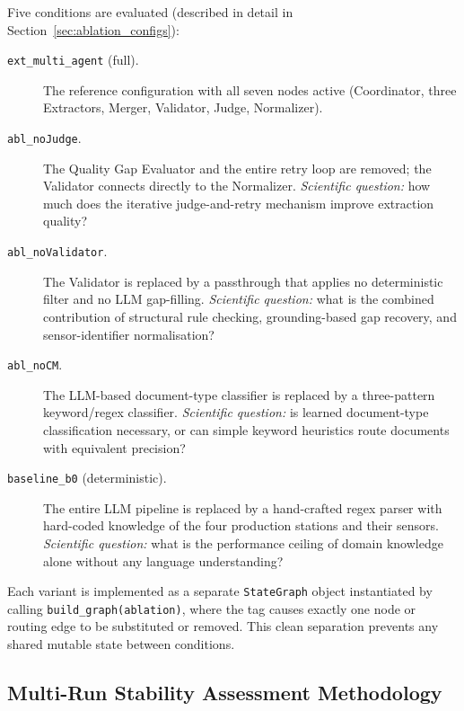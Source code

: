 ﻿\documentclass[11pt]{article}
\begin{document}
Five conditions are evaluated (described in detail in
Section~\ref{sec:ablation_configs}):

\begin{description}
    \item[\texttt{ext\_multi\_agent} (full).] The reference configuration with
          all seven nodes active (Coordinator, three Extractors, Merger, Validator,
          Judge, Normalizer).
    \item[\texttt{abl\_noJudge}.] The Quality Gap Evaluator and the entire retry
          loop are removed; the Validator connects directly to the Normalizer.
          \emph{Scientific question:} how much does the iterative judge-and-retry
          mechanism improve extraction quality?
    \item[\texttt{abl\_noValidator}.] The Validator is replaced by a passthrough
          that applies no deterministic filter and no LLM gap-filling.
          \emph{Scientific question:} what is the combined contribution of
          structural rule checking, grounding-based gap recovery, and
          sensor-identifier normalisation?
    \item[\texttt{abl\_noCM}.] The LLM-based document-type classifier is replaced
          by a three-pattern keyword/regex classifier.
          \emph{Scientific question:} is learned document-type classification
          necessary, or can simple keyword heuristics route documents with
          equivalent precision?
    \item[\texttt{baseline\_b0} (deterministic).] The entire LLM pipeline is
          replaced by a hand-crafted regex parser with hard-coded knowledge of
          the four production stations and their sensors.
          \emph{Scientific question:} what is the performance ceiling of domain
          knowledge alone without any language understanding?
\end{description}

Each variant is implemented as a separate \texttt{StateGraph} object
instantiated by calling \texttt{build\_graph(ablation)}, where the tag causes
exactly one node or routing edge to be substituted or removed.
This clean separation prevents any shared mutable state between conditions.

\subsection{Multi-Run Stability Assessment Methodology}
\label{sec:stability_design}
\end{document}
